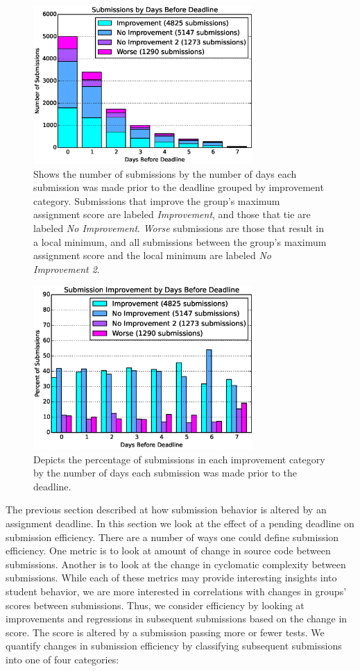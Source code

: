 \begin{figure}[!t]
\centering \includegraphics[width=3.3in]{graphs/Submissions_by_Days_Before_Deadline.eps}
\caption{Shows the number of submissions by the number of days each submission
  was made prior to the deadline grouped by improvement category.  Submissions
  that improve the group's maximum assignment score are labeled
  \emph{Improvement}, and those that tie are labeled \emph{No
    Improvement}. \emph{Worse} submissions are those that result in a local
  minimum, and all submissions between the group's maximum assignment score and
  the local minimum are labeled \emph{No Improvement 2}.}
\end{figure}

\begin{figure}[!t]
\centering
\includegraphics[width=3.3in]{graphs/Submission_Improvement_by_Days_Before_Deadline.eps}
\caption{Depicts the percentage of submissions in each improvement category by
  the number of days each submission was made prior to the deadline.}
\end{figure}

The previous section described at how submission behavior is altered by an
assignment deadline. In this section we look at the effect of a pending
deadline on submission efficiency. There are a number of ways one could define
submission efficiency. One metric is to look at amount of change in source code
between submissions. Another is to look at the change in cyclomatic complexity
between submissions. While each of these metrics may provide interesting
insights into student behavior, we are more interested in correlations with
changes in groups' scores between submissions. Thus, we consider efficiency by
looking at improvements and regressions in subsequent submissions based on the
change in score. The score is altered by a submission passing more or fewer
tests. We quantify changes in submission efficiency by classifying subsequent
submissions into one of four categories:

